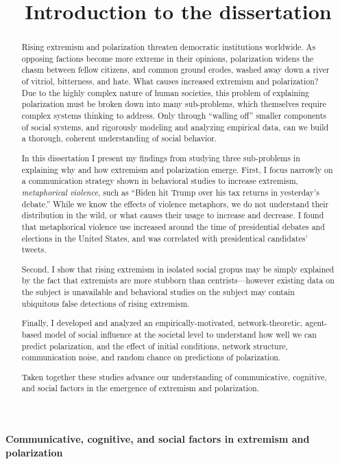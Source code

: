 \documentclass[12pt,letterpaper]{article}
\title{Introduction to the dissertation}
\date{}
\begin{document}

\vspace{-2.5in}
\textbf{Communicative, cognitive, and social factors in
extremism and polarization} 
\begin{abstract}
  Rising extremism and polarization threaten democratic institutions worldwide.
  As opposing factions become more extreme in their opinions, polarization
  widens the chasm between fellow citizens, and common ground erodes, washed
  away down a river of vitriol, bitterness, and hate. What causes increased
  extremism and polarization? Due to the highly complex nature of human
  societies, this problem of explaining polarization must be broken down into
  many sub-problems, which themselves require complex systems thinking to
  address. Only through ``walling off'' smaller components of social systems,
  and rigorously modeling and analyzing empirical data,
  can we build a thorough, coherent understanding of social behavior.

  In this dissertation I present my findings from studying three
  sub-problems in explaining why and how extremism and polarization emerge.
  First, I focus narrowly on a communication strategy shown in behavioral
  studies to increase extremism, \emph{metaphorical violence}, such as 
  ``Biden hit Trump over his tax returns in yesterday's debate.'' While we know
  the effects of violence metaphors, we do not understand their distribution
  in the wild, or what causes their usage to increase and decrease. I found
  that metaphorical violence use increased around the time of presidential
  debates and elections in the United States, and was correlated with 
  presidentical candidates' tweets. 

  Second, I show that rising extremism
  in isolated social gropus may be simply explained by the fact that
  extremists are more stubborn than centrists---however existing data on the
  subject is unavailable and behavioral studies on the subject may
  contain ubiquitous false detections of rising extremism. 

  Finally, I developed
  and analyzed an empirically-motivated, network-theoretic, agent-based model of 
  social influence at the societal level to understand how well we can 
  predict polarization, and the effect of initial conditions, network structure,
  communication noise, and random chance on predictions of polarization.

  Taken together these studies advance our understanding of communicative,
  cognitive, and social factors in the emergence of extremism and polarization.
\end{abstract}
\end{document}
